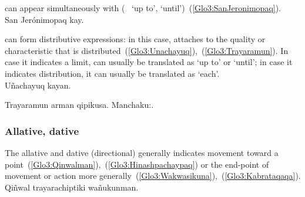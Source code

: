 \noindent
{} can appear simultaneously with  (\Sp~ ‘up to’, ‘until’)~(\ref{Glo3:SanJeronimopaq}).\\

%
{San Jerónimopaq  kay.}%
{}%
{}{}%

\noindent
{} can form distributive expressions: in this case,  attaches to the quality or characteristic that is distributed~(\ref{Glo3:Unachayuq}),~(\ref{Glo3:Trayaramun}). In case it indicates a limit,  can usually be translated as ‘up to’ or ‘until’; in case it indicates distribution, it can usually be translated as ‘each’.\\

%
{Uñachayuq kayan.}%
{}%
{}{}%

%
{Trayaramun arman qipikusa. Manchaku:.}%
{}%
{}{}%

  
\subsubsection{Allative, dative }
The allative and dative (directional)  generally indicates movement toward a point~(\ref{Glo3:Qinwalman}),~(\ref{Glo3:Hinashpachaypaq}) or the end-point of movement or action more generally~(\ref{Glo3:Wakwasikuna}),~(\ref{Glo3:Kabrataqaqa}).\\

%
{Qiñwal trayarachiptiki wañukunman.}%
{}%
{}{}%

